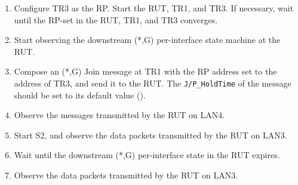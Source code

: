 \documentclass[11pt]{report}
\begin{document}
\begin{enumerate}

  \item Configure TR3 as the RP. Start the RUT, TR1, and TR3. If
  necessary, wait until the RP-set in the RUT, TR1, and TR3
  converges.

  \item Start observing the downstream (*,G) per-interface state
  machine at the RUT.

  \item Compose an (*,G) Join message at TR1 with the RP address set
  to the address of TR3, and send it to the RUT.
  The \verb=J/P_HoldTime= of the message should be set to its default
  value ({\PimsmJPHoldTime}).

  \item Observe the messages transmitted by the RUT on LAN4.

  \item Start S2, and observe the data packets transmitted by the RUT on
  LAN3.

  \item Wait until the downstream (*,G) per-interface state in the RUT
  expires.

  \item Observe the data packets transmitted by the RUT on LAN3.

\end{enumerate}

\end{document}

